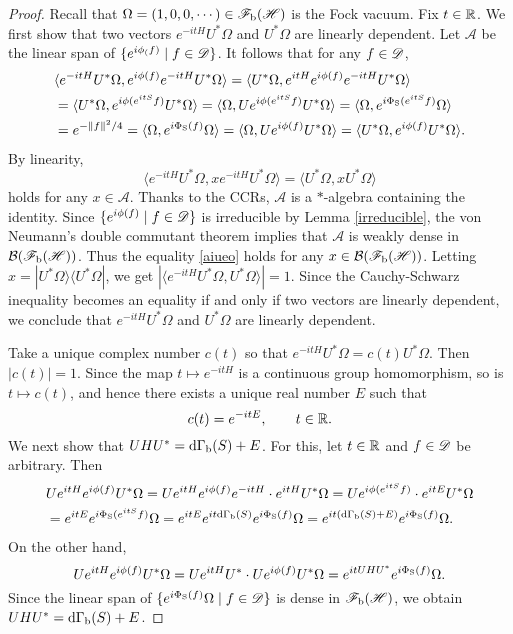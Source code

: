 \documentclass[12pt]{article}
\theoremstyle{plain}
\numberwithin{equation}{section}
\theoremstyle{remark}
\begin{document}
\begin{proof}
Recall that $\Omega=(1,0,0,\cdots)\in\mathscr{F}_\mathrm{b}(\mathscr{H})$ is the Fock vacuum.
Fix $t\in\mathbb{R}$.
We first show that two vectors $e^{-itH}U^*\Omega$ and $U^*\Omega$ are linearly dependent.
Let $\mathcal{A}$ be the linear span of $\{e^{i\phi_(f)} \mid f\in\mathscr{D}\}$.
It follows that for any $f\in\mathscr{D}$,
\begin{align*}
 &\langle e^{-itH}U^*\Omega,e^{i\phi(f)}e^{-itH}U^*\Omega\rangle 
  = \langle U^*\Omega,e^{itH}e^{i\phi(f)}e^{-itH}U^*\Omega\rangle\\ 
   &= \langle U^*\Omega,e^{i\phi(e^{itS}f)}U^*\Omega\rangle
= \langle \Omega,Ue^{i\phi(e^{itS}f)}U^*\Omega\rangle = \langle \Omega,e^{i\Phi_\mathrm{S}(e^{itS}f)}\Omega\rangle \\
&= e^{-\|f\|^2/4}= \langle \Omega,e^{i\Phi_\mathrm{S}(f)}\Omega\rangle = \langle \Omega,Ue^{i\phi(f)}U^*\Omega\rangle =  \langle U^*\Omega,e^{i\phi(f)}U^*\Omega\rangle.
\end{align*}
By linearity,
\begin{equation}\label{aiueo}
\langle e^{-itH}U^*\Omega,xe^{-itH}U^*\Omega\rangle = \langle U^*\Omega,xU^*\Omega\rangle
\end{equation}
holds for any $x\in \mathcal{A}$.
Thanks to the CCRs, $\mathcal{A}$ is a $*$-algebra containing the identity.
Since $\{e^{i\phi(f)} \mid f\in \mathscr{D}\}$ is irreducible by Lemma \ref{irreducible}, 
the von Neumann's double commutant theorem implies that
$\mathcal{A}$ is weakly dense in $\mathcal{B}(\mathscr{F}_\mathrm{b}(\mathscr{H}))$.
Thus the equality \eqref{aiueo} holds for any $x\in\mathcal{B}(\mathscr{F}_\mathrm{b}(\mathscr{H}))$.
Letting $x=|U^*\Omega\rangle\langle U^*\Omega|$, we get $|\langle e^{-itH}U^*\Omega,U^*\Omega\rangle|=1$.
Since the Cauchy-Schwarz inequality becomes an equality if and only if two vectors are linearly dependent,
we conclude that $e^{-itH}U^*\Omega$ and $U^*\Omega$ are linearly dependent.

Take a unique complex number $c(t)$ so that $e^{-itH}U^*\Omega=c(t)U^*\Omega$.
Then $|c(t)|=1$.
Since the map $t\mapsto e^{-itH}$ is a continuous group homomorphism, so is $t\mapsto c(t)$, 
and hence there exists a unique real number $E$ such that 
\[
c(t)=e^{-itE}, \qquad  t\in\mathbb{R}.
\]
We next show that $UHU^*= \mathrm{d\Gamma_b}(S)+E$.
For this, let $t\in\mathbb{R}$ and $f\in\mathscr{D}$ be arbitrary.
Then
\begin{align*}
&Ue^{itH}e^{i\phi(f)}U^*\Omega 
 = Ue^{itH}e^{i\phi(f)}e^{-itH}\cdot e^{itH}U^*\Omega
  = Ue^{i\phi(e^{itS}f)}\cdot e^{itE}U^*\Omega\\
&=e^{itE}e^{i\Phi_\mathrm{S}(e^{itS}f)}\Omega = e^{itE}e^{it\mathrm{d\Gamma_b}(S)}e^{i\Phi_\mathrm{S}(f)}\Omega
  = e^{it(\mathrm{d\Gamma_b}(S)+E)}e^{i\Phi_\mathrm{S}(f)}\Omega.
\end{align*}
On the other hand, 
\[
Ue^{itH}e^{i\phi(f)}U^*\Omega = Ue^{itH}U^*\cdot Ue^{i\phi(f)}U^*\Omega = e^{itUHU^*}e^{i\Phi_\mathrm{S}(f)}\Omega.
\]
Since the linear span of $\{e^{i\Phi_\mathrm{S}(f)}\Omega \mid f\in\mathscr{D}\}$ is dense in $\mathscr{F}_\mathrm{b}(\mathscr{H})$,
we obtain $UHU^*= \mathrm{d\Gamma_b}(S)+E$.
\end{proof}
\end{document}
